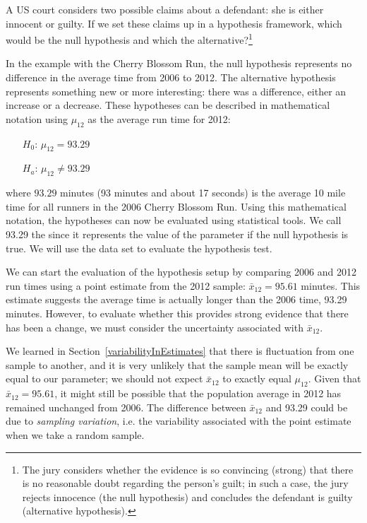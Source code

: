 \begin{exercise} \label{hypTestCourtExample}
A US court considers two possible claims about a defendant: she is either innocent or guilty. If we set these claims up in a hypothesis framework, which would be the null hypothesis and which the alternative?\footnote{The jury considers whether the evidence is so convincing (strong) that there is no reasonable doubt regarding the person's guilt; in such a case, the jury rejects innocence (the null hypothesis) and concludes the defendant is guilty (alternative hypothesis).}
\end{exercise}

In the example with the Cherry Blossom Run, the null hypothesis represents no difference in the average time from 2006 to 2012. The alternative hypothesis represents something new or more interesting: there was a difference, either an increase or a decrease. These hypotheses can be described in mathematical notation using $\mu_{12}$ as the average run time for 2012:
\begin{itemize}
\setlength{\itemsep}{0mm}
\item[$H_0$:] $\mu_{12} = 93.29$ %
\item[$H_a$:] $\mu_{12} \neq 93.29$
\end{itemize}
where $93.29$ minutes (93 minutes and about 17 seconds) is the average 10 mile time for all runners in the 2006 Cherry Blossom Run. Using this mathematical notation, the hypotheses can now be evaluated using statistical tools. We call 93.29 the  since it represents the value of the parameter if the null hypothesis is true. We will use the  data set to evaluate the hypothesis test.



We can start the evaluation of the hypothesis setup by comparing 2006 and 2012 run times using a point estimate from the 2012 sample: $\bar{x}_{12} = 95.61$ minutes. This estimate suggests the average time is actually longer than the 2006 time, 93.29 minutes. However, to evaluate whether this provides strong evidence that there has been a change, we must consider the uncertainty associated with $\bar{x}_{12}$.

We learned in Section~\ref{variabilityInEstimates} that there is fluctuation from one sample to another, and it is very unlikely that the sample mean will be exactly equal to our parameter; we should not expect $\bar{x}_{12}$ to exactly equal $\mu_{12}$. Given that $\bar{x}_{12} = 95.61$, it might still be possible that the population average in 2012 has remained unchanged from 2006. The difference between $\bar{x}_{12}$ and 93.29 could be due to \emph{sampling variation}, i.e. the variability associated with the point estimate when we take a random sample.

